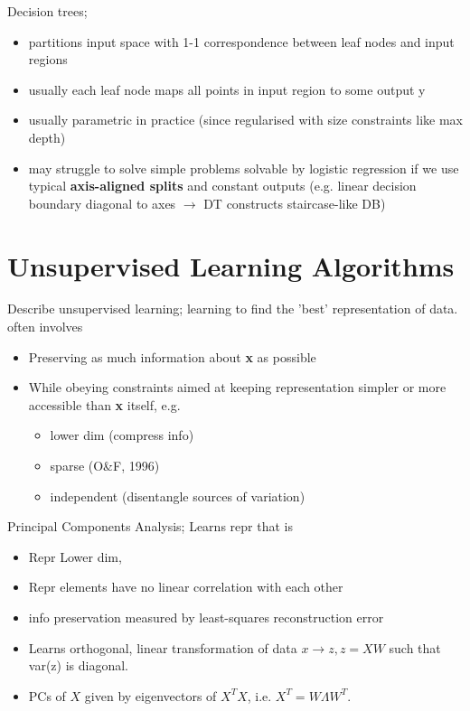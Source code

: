 \documentclass{article}
\begin{document}
Decision trees; \begin{itemize} \item partitions input space with 1-1 correspondence between leaf nodes and input regions \item usually each leaf node maps all points in input region to some output y \item usually parametric in practice (since regularised with size constraints like max depth) \item may struggle to solve simple problems solvable by logistic regression if we use typical \textbf{axis-aligned splits} and constant outputs (e.g. linear decision boundary diagonal to axes $\to$ DT constructs staircase-like DB) \end{itemize}

\section{Unsupervised Learning Algorithms}

Describe unsupervised learning; learning to find the 'best' representation of data. often involves \begin{itemize} \item Preserving as much information about \textbf{x} as possible \item While obeying constraints aimed at keeping representation simpler or more accessible than \textbf{x} itself, e.g.  \begin{itemize} \item lower dim (compress info) \item sparse (O\&F, 1996) \item independent (disentangle sources of variation) \end{itemize} \end{itemize}

Principal Components Analysis; Learns repr that is \begin{itemize} \item Repr Lower dim, \item Repr elements have no linear correlation with each other \item info preservation measured by least-squares reconstruction error \item Learns orthogonal, linear transformation of data $x\to z, z=XW$ such that var(z) is diagonal.  \item PCs of $X$ given by eigenvectors of $X^TX$, i.e. $X^T=W\Lambda W^T$.  \end{itemize}
\end{document}
